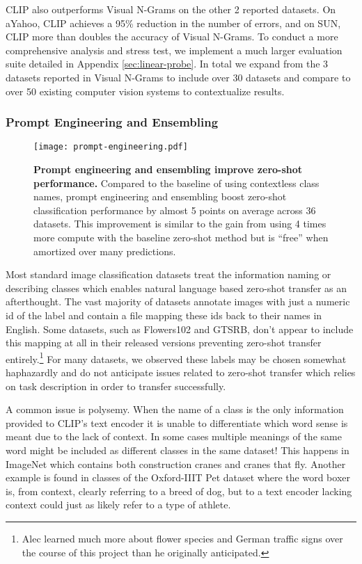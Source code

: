 \documentclass{article}
\begin{document}
CLIP also outperforms Visual N-Grams on the other 2 reported datasets. On aYahoo, CLIP achieves a 95\% reduction in the number of errors, and on SUN, CLIP more than doubles the accuracy of Visual N-Grams. To conduct a more comprehensive analysis and stress test, we implement a much larger evaluation suite detailed in Appendix \ref{sec:linear-probe}. In total we expand from the 3 datasets reported in Visual N-Grams to include over 30 datasets and compare to over 50 existing computer vision systems to contextualize results.

\subsubsection{Prompt Engineering and Ensembling}

\begin{figure}[t]
\begin{center}
\centerline{\texttt{[image: prompt-engineering.pdf]}}
\caption{\textbf{Prompt engineering and ensembling improve zero-shot performance.} Compared to the baseline of using contextless class names, prompt engineering and ensembling boost zero-shot classification performance by almost 5 points on average across 36 datasets. This improvement is similar to the gain from using 4 times more compute with the baseline zero-shot method but is ``free'' when amortized over many predictions.}
\label{prompt_engineering}
\end{center}
\vspace{-1em}
\end{figure}

Most standard image classification datasets treat the information naming or describing classes which enables natural language based zero-shot transfer as an afterthought. The vast majority of datasets annotate images with just a numeric id of the label and contain a file mapping these ids back to their names in English. Some datasets, such as Flowers102 and GTSRB, don't appear to include this mapping at all in their released versions preventing zero-shot transfer entirely.\footnote{Alec learned much more about flower species and German traffic signs over the course of this project than he originally anticipated.} For many datasets, we observed these labels may be chosen somewhat haphazardly and do not anticipate issues related to zero-shot transfer which relies on task description in order to transfer successfully.

A common issue is polysemy. When the name of a class is the only information provided to CLIP's text encoder it is unable to differentiate which word sense is meant due to the lack of context. In some cases multiple meanings of the same word might be included as different classes in the same dataset! This happens in ImageNet which contains both construction cranes and cranes that fly. Another example is found in classes of the Oxford-IIIT Pet dataset where the word boxer is, from context, clearly referring to a breed of dog, but to a text encoder lacking context could just as likely refer to a type of athlete.
\end{document}
